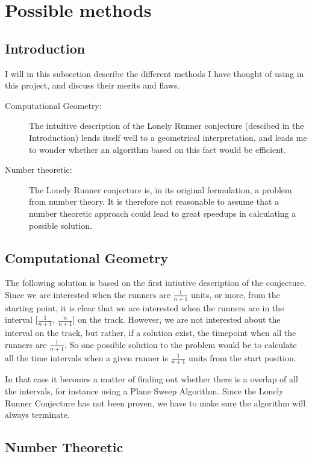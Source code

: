 \section{Possible methods}
\label{choiceOfMethod}

\subsection{Introduction}
I will in this subsection describe the different methods I have thought of using in this project, and discuss their merits and flaws.

\begin{description}
\item[Computational Geometry:] The intuitive description of the Lonely Runner conjecture (descibed in the Introduction) lends itself well to a geometrical interpretation, and leads me to wonder whether an algorithm based on this fact would be efficient.

\item[Number theoretic:] The Lonely Runner conjecture is, in its original formulation, a problem from number theory. It is therefore not reasonable to assume that a number theoretic approach could lead to great speedups in calculating a possible solution.
\end{description}

\subsection{Computational Geometry}
The following solution is based on the first intiutive description of the conjecture. Since we are interested when the runners are $\frac{1}{n + 1}$ units, or more, from the starting point, it is clear that we are interested when the runners are in the interval [$\frac{1}{n + 1}$, $\frac{n}{n + 1}$] on the track. However, we are not interested about the interval on the track, but rather, if a solution exist, the timepoint when all the runners are $\frac{1}{n+1}$. So one possible solution to the problem would be to calculate all the time intervals when a given runner is $\frac{1}{n+1}$ units from the start position. 

In that case it becomes a matter of finding out whether there is a overlap of all the intervals, for instance using a Plane Sweep Algorithm. Since the Lonely Runner Conjecture has not been proven, we have to make sure the algorithm will always terminate.  

\subsection{Number Theoretic}

